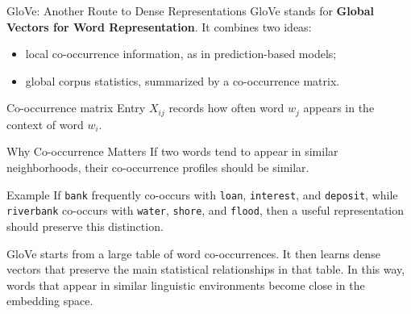 \documentclass[aspectratio=169]{beamer}
\begin{document}
%
%
\begin{frame}{GloVe: Another Route to Dense Representations}
GloVe stands for \textbf{Global Vectors for Word Representation}. It combines two ideas:
\begin{itemize}
    \item local co-occurrence information, as in prediction-based models;
    \item global corpus statistics, summarized by a co-occurrence matrix.
\end{itemize}

\vspace{0.15cm}
\begin{block}{Co-occurrence matrix}
Entry $X_{ij}$ records how often word $w_j$ appears in the context of word $w_i$.
\end{block}
\end{frame}
%
%
\begin{frame}{Why Co-occurrence Matters}
If two words tend to appear in similar neighborhoods, their co-occurrence profiles should be similar.

\vspace{0.15cm}
\begin{block}{Example}
If \texttt{bank} frequently co-occurs with \texttt{loan}, \texttt{interest}, and \texttt{deposit}, while \texttt{riverbank} co-occurs with \texttt{water}, \texttt{shore}, and \texttt{flood}, then a useful representation should preserve this distinction.
\end{block}

\vspace{0.12cm}
GloVe starts from a large table of word co-occurrences. It then learns dense vectors that preserve the main statistical relationships in that table. In this way, words that appear in similar linguistic environments become close in the embedding space.

\end{frame}
%
%
\end{document}
